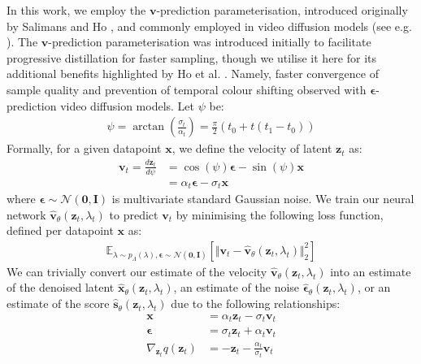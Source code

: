 \documentclass[ oneside,%
                    author={George Herbert},
                    degree={MSci},
                     title={Diffusion Models for Time-Evolving Precipitation Fields},
                  subtitle={}]{dissertation}
\begin{document}
In this work, we employ the $\mathbf{v}$-prediction parameterisation, introduced originally by Salimans and Ho \cite{Progressive_Distillation_Salimans}, and commonly employed in video diffusion models (see e.g. \cite{VDM_Ho,Imagen_Video_Ho}). The $\mathbf{v}$-prediction parameterisation was introduced initially to facilitate progressive distillation for faster sampling, though we utilise it here for its additional benefits highlighted by Ho et al. \cite{Imagen_Video_Ho}. Namely, faster convergence of sample quality and prevention of temporal colour shifting observed with $\boldsymbol\epsilon$-prediction video diffusion models. Let $\psi$ be:
\begin{align}
      \psi = \arctan\left(\frac{\sigma_t}{\alpha_t}\right)=\frac{\pi}{2}(t_0+t(t_1-t_0))
\end{align}
Formally, for a given datapoint $\mathbf{x}$, we define the velocity of latent $\mathbf{z}_t$ as:
\begin{align}
      \mathbf{v}_t=\frac{d\mathbf{z}_t}{d\psi}&=\cos(\psi)\boldsymbol\epsilon-\sin(\psi)\mathbf{x}\\
      &=\alpha_t\boldsymbol\epsilon -\sigma_t\mathbf{x}
\end{align}
where $\boldsymbol\epsilon\sim\mathcal{N}(\mathbf{0}, \mathbf{I})$ is multivariate standard Gaussian noise. We train our neural network $\hat{\mathbf{v}}_\theta(\mathbf{z}_t,\lambda_t)$ to predict $\mathbf{v}_t$ by minimising the following loss function, defined per datapoint $\mathbf{x}$ as:
\begin{align}
      \mathbb{E}_{\lambda\sim p_\Lambda(\lambda),\boldsymbol\epsilon\sim\mathcal{N}(\mathbf{0},\mathbf{I})}\left[\Vert\mathbf{v}_t-\hat{\mathbf{v}}_\theta(\mathbf{z}_t, \lambda_t)\Vert_2^2\right]\label{eq:v_parameterisation_loss}
\end{align}
We can trivially convert our estimate of the velocity $\hat{\mathbf{v}}_\theta(\mathbf{z}_t,\lambda_t)$ into an estimate of the denoised latent $\hat{\mathbf{x}}_\theta(\mathbf{z}_t,\lambda_t)$, an estimate of the noise $\hat{\boldsymbol\epsilon}_\theta(\mathbf{z}_t,\lambda_t)$, or an estimate of the score $\hat{\mathbf{s}}_\theta(\mathbf{z}_t,\lambda_t)$ due to the following relationships:
\begin{align}
      \mathbf{x}&=\alpha_t\mathbf{z}_t-\sigma_t\mathbf{v}_t\\
      \boldsymbol\epsilon&=\sigma_t\mathbf{z}_t+\alpha_t\mathbf{v}_t\\
      \nabla_{\mathbf{z}_t}q(\mathbf{z}_t)&=-\mathbf{z}_t-\frac{\alpha_t}{\sigma_t}\mathbf{v}_t
\end{align}
\end{document}
